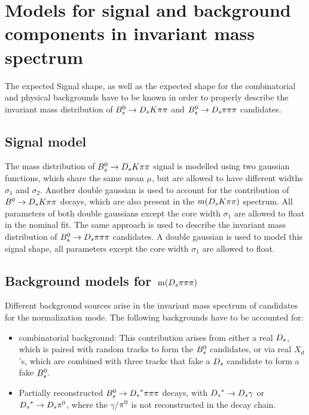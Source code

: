 \section{Models for signal and background components in invariant mass spectrum}
\label{sec: model}

The expected Signal shape, as well as the expected shape for the combinatorial and physical backgrounds have to be known in order to properly describe the invariant mass distribution of 
${{B}^0_{s}}\rightarrow{\ensuremath{{D}_{s}}}{\ensuremath{K}}{\ensuremath{\pi}}{\ensuremath{\pi}}$ and ${{B}^0_{s}}\rightarrow{\ensuremath{{D}_{s}}}{\ensuremath{\pi}}{\ensuremath{\pi}}{\ensuremath{\pi}}$ candidates.

\subsection{Signal model}
\label{subsec: signalmodel}
The mass distribution of ${{B}^0_{s}}\rightarrow{\ensuremath{{D}_{s}}}{\ensuremath{K}}{\ensuremath{\pi}}{\ensuremath{\pi}}$ signal is modelled using two gaussian functions, which share the same mean $\mu$, but are allowed to have different widths $\sigma_{1}$ and $\sigma_{2}$. 
Another double gaussian is used to account for the contribution of ${B}^{0}\rightarrow{\ensuremath{{D}_{s}}}{\ensuremath{K}}{\ensuremath{\pi}}{\ensuremath{\pi}}$ decays, which are also present in the $m({{D}_{s}}{K}{\pi}{\pi})$ spectrum. 
All parameters of both double gaussians except the core width $\sigma_{1}$ are allowed to float in the nominal fit. \newline
The same approach is used to describe the invariant mass distribution of ${{B}^0_{s}}\rightarrow{\ensuremath{{D}_{s}}}{\ensuremath{\pi}}{\ensuremath{\pi}}{\ensuremath{\pi}}$ candidates. 
A double gaussian is used to model this signal shape, all parameters except the core width $\sigma_{1}$ are allowed to float.

\subsection{Background models for $\mathrm{ \,m}({{D}_{s}}{\pi}{\pi}{\pi})$} 
\label{subsec: BkginNorm}
Different background sources arise in the invariant mass spectrum of candidates for the normalization mode. \newline
The following backgrounds have to be accounted for:
\begin{itemize}

\item combinatorial background: This contribution arises from either a real ${{D}_{s}}$, which is paired with random tracks to form the ${{B}^0_{s}}$ candidates, or via real $X_{d}$'s, which are combined with three tracks that fake a ${{D}_{s}}$ candidate to form a fake ${{B}^0_{s}}$.   

\item Partially reconstructed ${{B}^0_{s}}\rightarrow{\ensuremath{{D}_{s}}}^{*}{\pi}{\pi}{\pi}$ decays, with ${{D}_{s}}^{*}\rightarrow{\ensuremath{{D}_{s}}}\gamma$ or ${{D}_{s}}^{*}\rightarrow{\ensuremath{{D}_{s}}}{\ensuremath{{\pi}^0}}$, where the $\gamma$/${{\pi}^0}$ is not reconstructed in the decay chain. 

\end{itemize}


